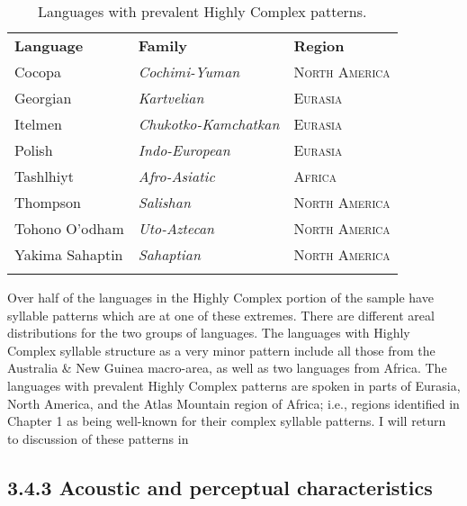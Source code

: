 \begin{table}
\begin{tabularx}{\textwidth}{XXX}
\lsptoprule

\textbf{Language} & \textbf{Family} & \textbf{Region}\\
Cocopa & \textit{Cochimi-Yuman} & \textsc{North} \textsc{America}\\
Georgian & \textit{Kartvelian} & \textsc{Eurasia}\\
Itelmen & \textit{Chukotko-Kamchatkan} & \textsc{Eurasia}\\
Polish & \textit{Indo-European} & \textsc{Eurasia}\\
Tashlhiyt & \textit{Afro-Asiatic} & \textsc{Africa}\\
Thompson & \textit{Salishan} & \textsc{North} \textsc{America}\\
Tohono O’odham & \textit{Uto-Aztecan} & \textsc{North} \textsc{America}\\
Yakima Sahaptin & \textit{Sahaptian} & \textsc{North} \textsc{America}\\
\lspbottomrule
\end{tabularx}
\caption{\label{3.16}Languages with prevalent Highly Complex patterns.}
\end{table}




  Over half of the languages in the Highly Complex portion of the sample have syllable patterns which are at one of these extremes. There are different areal distributions for the two groups of languages. The languages with Highly Complex syllable structure as a very minor pattern include all those from the Australia \& New Guinea macro-area, as well as two languages from Africa. The languages with prevalent Highly Complex patterns are spoken in parts of Eurasia, North America, and the Atlas Mountain region of Africa; i.e., regions identified in Chapter 1 as being well-known for their complex syllable patterns. I will return to discussion of these patterns in 


\subsection{3.4.3 Acoustic and perceptual characteristics}

